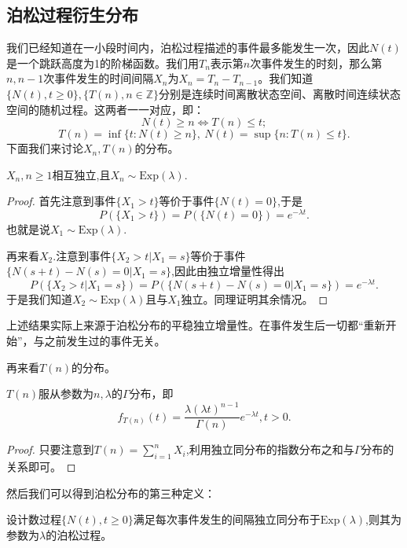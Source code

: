 \documentclass[lang=cn,10pt]{elegantbook}
\begin{document}
	\subsection{泊松过程衍生分布}
	我们已经知道在一小段时间内，泊松过程描述的事件最多能发生一次，因此\(N(t)\)是一个跳跃高度为1的阶梯函数。我们用\(T_n\)表示第\(n\)次事件发生的时刻，那么第\(n,n-1\)次事件发生的时间间隔\(X_n\)为\(X_n=T_n-T_{n-1}\)。我们知道\(\{N(t),t\ge 0
\},\{T(n),n\in \mathbb{Z}\}\)分别是连续时间离散状态空间、离散时间连续状态空间的随机过程。这两者一一对应，即：
	\[N(t)\ge n \Leftrightarrow T(n)\le t;\]
	\[T(n)=\inf\{t:N(t)\ge n\},\ N(t)=\sup\{n:T(n)\le t\}.\]
	下面我们来讨论\(X_n,T(n)\)的分布。
	\begin{theorem}
		\(X_n,n\ge 1\)相互独立,且\(X_n\sim \text{Exp}(\lambda)\).
	\end{theorem}
	\begin{proof}
		首先注意到事件\(\{X_1>t\}\)等价于事件\(\{N(t)=0\}\),于是
		\[P(\{X_1>t\})=P(\{N(t)=0\})=e^{-\lambda t}.\]
		也就是说\(X_1\sim \text{Exp}(\lambda)\).

		再来看\(X_2\).注意到事件\(\{X_2>t|X_1=s\}\)等价于事件\(\{N(s+t)-N(s)=0|X_1=s\}\),因此由独立增量性得出
		\[P(\{X_2>t|X_1=s\})=P(\{N(s+t)-N(s)=0|X_1=s\})=e^{-\lambda t}.\]
		于是我们知道\(X_2\sim \text{Exp}(\lambda)\)且与\(X_1\)独立。同理证明其余情况。
	\end{proof}
	\begin{note}
		上述结果实际上来源于泊松分布的平稳独立增量性。在事件发生后一切都“重新开始”，与之前发生过的事件无关。
	\end{note}
	再来看\(T(n)\)的分布。
	\begin{theorem}
		\(T(n)\)服从参数为\(n,\lambda\)的\(\Gamma\)分布，即
		\[f_{T(n)}(t)=\frac{\lambda(\lambda t)^{n-1}}{\Gamma(n)}e^{-\lambda t},t>0.\]
	\end{theorem}
	\begin{proof}
		只要注意到\(T(n)=\sum_{i=1}^{n}X_i\),利用独立同分布的指数分布之和与\(\Gamma\)分布的关系即可。
	\end{proof}
	然后我们可以得到泊松分布的第三种定义：
	\begin{definition}[泊松过程3]
		设计数过程\(\{N(t),t\ge 0\}\)满足每次事件发生的间隔独立同分布于\(\text{Exp}(\lambda)\),则其为参数为\(\lambda\)的泊松过程。
	\end{definition}
\end{document}

